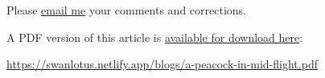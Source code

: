 \documentclass[
  a4paper,
]{article}
\begin{document}
Please \href{mailto:feedback.swanlotus@gmail.com}{email me} your
comments and corrections.

\noindent A PDF version of this article is
\href{./a-peacock-in-midflight.pdf}{available for download here}:

\begin{small}

\begin{sffamily}

\url{https://swanlotus.netlify.app/blogs/a-peacock-in-mid-flight.pdf}

\end{sffamily}

\end{small}
\end{document}
